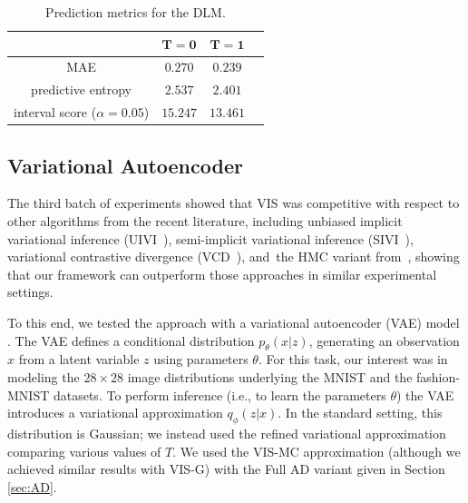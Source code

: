 \begin{table}[H]
\centering
\caption{Prediction metrics for the DLM.}\label{tbl:preds_dlm}
\begin{tabular}{c@{\hskip 1.1in}c@{\hskip 1in}c@{\hskip 1in}c}
\toprule
   & $\bm{T=0}$                             & $\bm{T=1}$   \\ 
 \midrule
    MAE          & $0.270$ &  $0.239$ \\

    predictive entropy          & $2.537$ &  $2.401$ \\
    interval score ($\alpha=0.05$) & $15.247$ & $13.461$\\
 \bottomrule
\end{tabular}
\end{table}

\subsection{Variational Autoencoder}

The third batch of experiments showed that VIS 
was competitive with respect to other algorithms from the recent literature, including unbiased implicit variational inference (UIVI~\cite{pmlr-v89-titsias19a}), semi-implicit variational inference (SIVI~\cite{yin2018semi}),  variational contrastive divergence (VCD~\cite{pmlr-v97-ruiz19a}), 
and~the HMC variant from~\cite{hoffman2017learning}, showing that our framework can outperform those approaches in similar experimental settings. 

 To this end, we tested the approach with a variational autoencoder (VAE) model \cite{kingma2013auto}. %
The VAE defines a conditional distribution $p_{\theta}(x | z)$, generating an observation $x$ from a latent variable $z$ using {parameters $\theta$}. For this task, our interest 
was in modeling the $28 \times 28$ image distributions 
underlying the MNIST %
\cite{lecun-mnisthandwrittendigit-2010} and the fashion-MNIST \cite{xiao2017/online} datasets. To perform inference (i.e., to learn
the parameters $\theta$) the VAE introduces a variational approximation $q_{\phi}(z | x)$. In the standard setting, this distribution is Gaussian; we instead used the refined variational approximation comparing various values of $T$. We used the VIS-MC approximation (although we achieved similar results
with VIS-G) with the Full AD variant given in Section \ref{sec:AD}.

